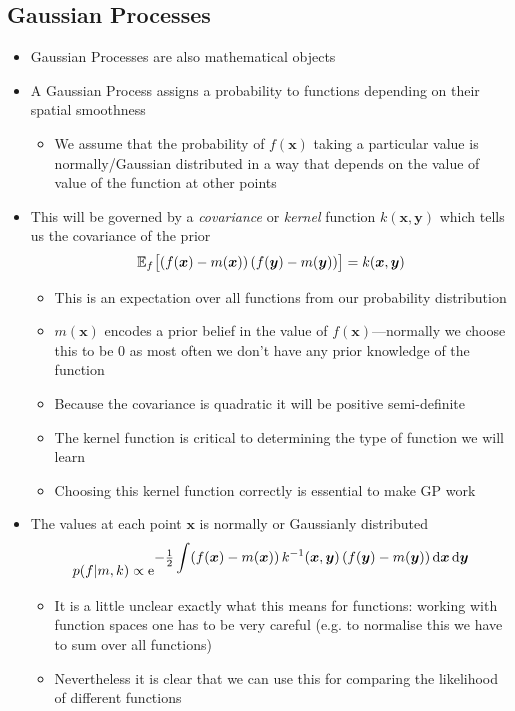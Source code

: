 \documentclass[11pt]{article}
\newcommand{\av}[2][]{\mathbb{E}_{#1\!}\left[ #2 \right]}
\newcommand{\E}[1]{{\rm e}^{\displaystyle #1}}
\newcommand{\dd}{\mathrm{d}}
\begin{document}
\subsection{Gaussian Processes}
\label{sec:org835ba3a}
\begin{itemize}
\item Gaussian Processes are also mathematical objects
\item A Gaussian Process assigns a  probability to functions
depending on their spatial smoothness
\begin{itemize}
\item We assume that the probability of \(f(\bm{x})\) taking a
particular value is normally/Gaussian distributed in a way that
depends on the value of  value of the function at other points
\end{itemize}
\item This will be governed by a \emph{covariance} or \emph{kernel} function
\(k(\bm{x},\bm{y})\)  which tells us the covariance of the prior
$$ \av[f]{ (f(\bm{x})-m(\bm{x})) \, (f(\bm{y})-m(\bm{y}))\strut } =
     k(\bm{x},\bm{y}) $$
\begin{itemize}
\item This is an expectation over all functions from our probability distribution
\item \(m(\bm{x})\) encodes a prior belief in the value of
\(f(\bm{x})\)---normally we choose this to be 0 as most often
we don't have any prior knowledge of the function
\item Because the covariance is quadratic it will be positive semi-definite
\item The kernel function is critical to determining the type of
function we will learn
\item Choosing this kernel function correctly is essential to make GP work
\end{itemize}
\item The values at each point \(\bm{x}\) is normally or Gaussianly
distributed
$$ p(f|m,k) \propto \E{-\tfrac{1}{2} \int (f(\bm{x})-m(\bm{x})) 
      \, k^{-1}(\bm{x},\bm{y}) \, (f(\bm{y}) -m(\bm{y})) \, \dd \bm{x}
      \, \dd \bm{y}} $$
\begin{itemize}
\item It is a little unclear exactly what this means for functions: working
with function spaces one has to be very careful (e.g. to
normalise this we have to sum over all functions)
\item Nevertheless it is clear that we can use this for comparing the
likelihood of different functions

\end{itemize}
\end{itemize}
\end{document}
